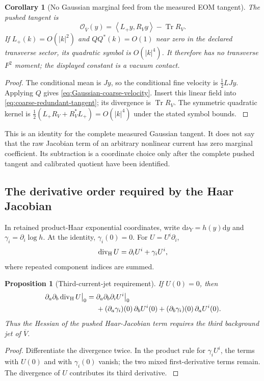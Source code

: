 \documentclass[11pt,oneside,openany]{book}
\newtheorem{proposition}[proposition]{Proposition}
\newtheorem{corollary}[corollary]{Corollary}
\theoremstyle{definition}
\theoremstyle{remark}
\newcommand{\dd}{\mathrm d}
\newcommand{\Tr}{\operatorname{Tr}}
\newcommand{\ip}[2]{\left\langle#1,#2\right\rangle}
\newcommand{\src}[2]{\cite[#2]{#1}}
\begin{document}
\begin{corollary}[No Gaussian marginal feed from the measured EOM tangent]
\label{cor:Gaussian-EOM-no-feed}
The pushed tangent is
\begin{equation}\label{eq:Gaussian-EOM-owner}
\mathcal O_{\overline V}(y)
=\ip{L_+y}{R_Vy}-\Tr R_V.
\end{equation}
If $L_+(k)=O(|k|^2)$ and $QQ^*(k)=O(1)$ near zero in the declared
transverse sector, its quadratic symbol is $O(|k|^4)$. It therefore
has no transverse $F^2$ moment; the displayed constant is a vacuum
contact.
\end{corollary}
\begin{proof}
The conditional mean is $Jy$, so the conditional fine velocity is
$\tfrac12LJy$. Applying $Q$ gives
\cref{eq:Gaussian-coarse-velocity}. Insert this linear field into
\cref{eq:coarse-redundant-tangent}; its divergence is $\Tr R_V$.
The symmetric quadratic kernel is
$\tfrac12(L_+R_V+R_V^*L_+)=O(|k|^4)$ under the stated symbol bounds.
\src{F8}{V58}
\end{proof}

This is an identity for the complete measured Gaussian tangent. It does
not say that the raw Jacobian term of an arbitrary nonlinear current
has zero marginal coefficient. Its subtraction is a coordinate choice
only after the complete pushed tangent and calibrated quotient have
been identified.

\subsection{The derivative order required by the Haar Jacobian}
\label{sec:Jacobian-third-jet}
In retained product-Haar exponential coordinates, write
$\dd\nu_Y=h(y)\dd y$ and $\gamma_i=\partial_i\log h$. At the identity,
$\gamma_i(0)=0$. For $U=U^i\partial_i$,
\[
\operatorname{div}_{\rm H}U=\partial_iU^i+\gamma_iU^i,
\]
where repeated component indices are summed.

\begin{proposition}[Third-current-jet requirement]
\label{prop:Jacobian-third-jet}
If $U(0)=0$, then
\begin{equation}\label{eq:Jacobian-third-jet}
\begin{aligned}
\partial_a\partial_b\operatorname{div}_{\rm H}U\big|_0
={}&\partial_a\partial_b\partial_iU^i\big|_0\\
 &+(\partial_a\gamma_i)(0)\,\partial_bU^i(0)
  +(\partial_b\gamma_i)(0)\,\partial_aU^i(0).
\end{aligned}
\end{equation}
Thus the Hessian of the pushed Haar-Jacobian term requires the third
background jet of $\overline V$.
\end{proposition}
\begin{proof}
Differentiate the divergence twice. In the product rule for
$\gamma_iU^i$, the terms with $U(0)$ and with $\gamma_i(0)$ vanish;
the two mixed first-derivative terms remain. The divergence of $U$
contributes its third derivative. \src{F8}{V60}
\end{proof}
\end{document}
